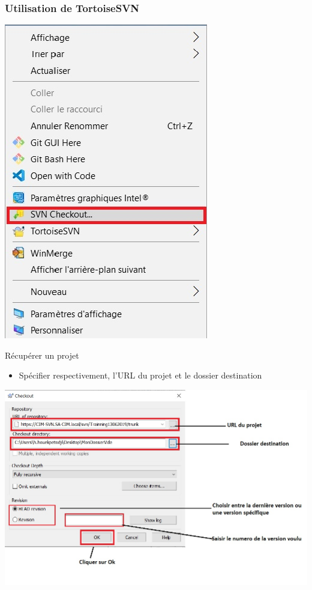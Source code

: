 \documentclass{beamer}
\begin{document}
\begin{frame}
\frametitle{Utilisation de TortoiseSVN}
\includegraphics[scale=0.25]{../images/checkout1.jpg}
\begin{block}{Récupérer un projet }

\begin{itemize}
\item Spécifier respectivement, l'URL du projet et le dossier destination
\end{itemize}
\end{block}
\includegraphics[scale=0.25]{../images/checkout2.jpg}
\end{frame}
\end{document}
